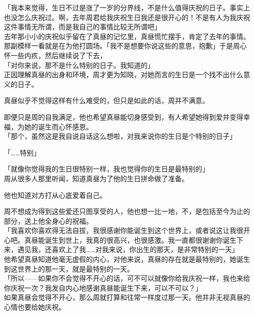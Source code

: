 「我本来觉得，生日不过是涨了一岁的分界线，不是什么值得庆祝的日子。事实上也没怎么庆祝过。啊，去年周君给我庆祝生日我还是很开心的！不是有人为我庆祝这件事情无所谓，而是我自己的事情比较无所谓吧」\\

去年那小小的庆祝似乎留在了真昼的记忆里，真昼慌忙摆手，肯定了去年的事情。\\

那副模样一看就是在为他打圆场。「我不是想要你说这些的意思，抱歉」于是周心怀一些内疚，然后继续说了下去，\\

「对你来说，那不是什么特别的日子。我知道的」\\

正因理解真昼的出身和环境，周才更为知晓，对她而言的生日是一个找不出什么意义的日子。

真昼似乎不觉得这样有什么难受的，但只是如此的话，周并不满意。

即便只是周的自我满足，他也希望真昼能切身感受到，有人希望她得到爱并变得幸福，为她的诞生而心怀感恩。\\

「那个，虽然这是我自说自话这么想啦，对我来说你的生日是个特别的日子」

「……特别」

「就像你觉得我的生日很特别一样，我也觉得你的生日是最特别的」\\

周从很多人那里听闻，知道真昼为了他的生日拼命做了准备。

他也知道对方打从心底爱着自己。

周不想成为得到这些爱还只图享受的人，他也想一比一地，不，是包括至今为止的部分，送上他全身心的祝福。\\

「我喜欢你喜欢得无法自拔，我很感谢你能诞生到这个世界上，或者说这让我很开心吧。真昼能诞生到世上，我真的很高兴，也很感激。我一直都很谢谢你诞生下来，遇见我，还喜欢上了我……对我来说，你出生的那天，是非常特别的一天」\\

他希望真昼知道他毫无虚假的内心，对他来说，真昼的存在就是最特别的，她诞生到这世界上的那一天，就是最特别的一天。\\

「所以——如果你不会觉得不开心的话，可不可以就像你给我庆祝一样，我也来给你庆祝一次？我发自内心地感谢真昼能诞生下来，可以不可以？」\\

如果真昼会觉得不开心，那么周就打算和往常一样度过那一天。他并非无视真昼的心情也要给她庆祝。

